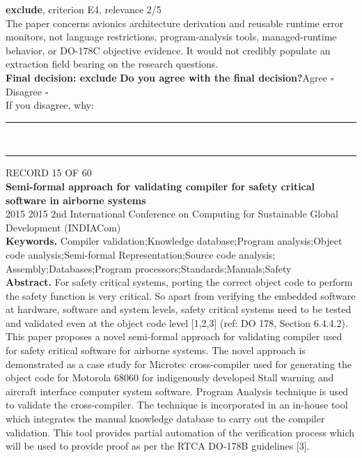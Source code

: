\documentclass[11pt,a4paper]{article}
\begin{document}
{\small\textbf{exclude}, criterion E4, relevance 2/5}\\[0.5mm]
{\small The paper concerns avionics architecture derivation and reusable runtime error monitors, not language restrictions, program-analysis tools, managed-runtime behavior, or DO-178C objective evidence. It would not credibly populate an extraction field bearing on the research questions.}\\[2.5mm]
{\small\textbf{Final decision: exclude}}
\vspace{2mm}
{\small\textbf{Do you agree with the final decision?}\quad{}Agree $\square$\qquad{}Disagree $\square$}\\[1mm]
{\footnotesize\color{soft}If you disagree, why:}\\[1mm]
\color{rule}\rule{\linewidth}{0.3pt}\\[3mm]\rule{\linewidth}{0.3pt}\color{black}
\clearpage
{\color{soft}\footnotesize RECORD 15 OF 60}\\[1mm]
{\large\bfseries Semi-formal approach for validating compiler for safety critical software in airborne systems}\\[1.5mm]
{\color{soft}\small 2015 \textperiodcentered{} 2015 2nd International Conference on Computing for Sustainable Global Development (INDIACom)}\\[2mm]
{\small\textbf{Keywords.} Compiler validation;Knowledge database;Program analysis;Object code analysis;Semi-formal Representation;Source code analysis; Assembly;Databases;Program processors;Standards;Manuals;Safety}\\[2mm]
{\small\textbf{Abstract.} For safety critical systems, porting the correct object code to perform the safety function is very critical. So apart from verifying the embedded software at hardware, software and system levels, safety critical systems need to be tested and validated even at the object code level [1,2,3] (ref: DO 178, Section 6.4.4.2). This paper proposes a novel semi-formal approach for validating compiler used for safety critical software for airborne systems. The novel approach is demonstrated as a case study for Microtec cross-compiler used for generating the object code for Motorola 68060 for indigenously developed Stall warning and aircraft interface computer system software. Program Analysis technique is used to validate the cross-compiler. The technique is incorporated in an in-house tool which integrates the manual knowledge database to carry out the compiler validation. This tool provides partial automation of the verification process which will be used to provide proof as per the RTCA DO-178B guidelines [3].}
\end{document}
